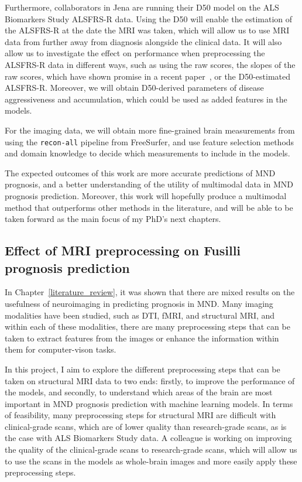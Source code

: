 Furthermore, collaborators in Jena are running their D50 model on the ALS Biomarkers Study ALSFRS-R data.
Using the D50 will enable the estimation of the ALSFRS-R at the date the MRI was taken, which will allow us to use MRI data from further away from diagnosis alongside the clinical data.
It will also allow us to investigate the effect on performance when preprocessing the ALSFRS-R data in different ways, such as using the raw scores, the slopes of the raw scores, which have shown promise in a recent paper~\cite{papaizEnsembleimbalancebasedClassificationAmyotrophic2024}, or the D50-estimated ALSFRS-R.
Moreover, we will obtain D50-derived parameters of disease aggressiveness and accumulation, which could be used as added features in the models.

For the imaging data, we will obtain more fine-grained brain measurements from using the \texttt{recon-all} pipeline from FreeSurfer, and use feature selection methods and domain knowledge to decide which measurements to include in the models.

The expected outcomes of this work are more accurate predictions of MND prognosis, and a better understanding of the utility of multimodal data in MND prognosis prediction.
Moreover, this work will hopefully produce a multimodal method that outperforms other methods in the literature, and will be able to be taken forward as the main focus of my PhD's next chapters.

\subsection{Effect of MRI preprocessing on Fusilli prognosis prediction}

In Chapter~\ref{literature_review}, it was shown that there are mixed results on the usefulness of neuroimaging in predicting prognosis in MND.
Many imaging modalities have been studied, such as DTI, fMRI, and structural MRI, and within each of these modalities, there are many preprocessing steps that can be taken to extract features from the images or enhance the information within them for computer-vison tasks.

In this project, I aim to explore the different preprocessing steps that can be taken on structural MRI data to two ends: firstly, to improve the performance of the models, and secondly, to understand which areas of the brain are most important in MND prognosis prediction with machine learning models.
In terms of feasibility, many preprocessing steps for structural MRI are difficult with clinical-grade scans, which are of lower quality than research-grade scans, as is the case with ALS Biomarkers Study data.
A colleague is working on improving the quality of the clinical-grade scans to research-grade scans, which will allow us to use the scans in the models as whole-brain images and more easily apply these preprocessing steps.

